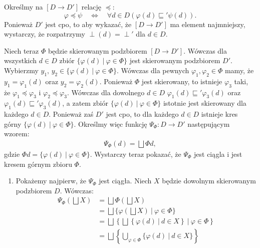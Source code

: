 \begin{dowod}
      Określmy na \([D\to D']\) relację  \(\preceq\):
\[
\varphi \preceq \psi\quad \Leftrightarrow\quad \forall d\in D \left(\varphi(d) \sqsubseteq' \psi(d)\right).
\]
Ponieważ \(D'\) jest cpo, to aby wykazać, że \([D\to D']\) ma element najmniejszy, wystarczy, że rozpatrzymy \(\perp(d)=\perp'\) dla \(d\in D\).

Niech teraz \(\Phi\) będzie skierowanym podzbiorem \([D\to D']\). 
      Wówczas  dla  wszystkich  \(d\in D\)  zbiór  \(\{\varphi(d)\  |\ \varphi\in\Phi\}\) jest  skierowanym podzbiorem  \(D'\). Wybierzmy \(y_1,\,y_2\in\{\varphi(d)\ |\ \varphi\in\Phi\}\). Wówczas dla pewnych \(\varphi_1, \varphi_2\in\Phi\) mamy, że \(y_1=\varphi_1(d)\) oraz \(y_2=\varphi_2(d)\). Ponieważ \(\Phi\) jest skierowany, to istnieje \(\varphi_3\) taki, że \(\varphi_1\preceq \varphi_3\) i \(\varphi_2\preceq \varphi_3\). Wówczas dla dowolnego \(d\in D\) \(\varphi_1(d) \sqsubseteq' \varphi_3(d)\) oraz \(\varphi_1(d) \sqsubseteq' \varphi_3(d)\), a zatem zbiór \(\{\varphi(d)\  |\ \varphi\in\Phi\}\) istotnie jest skierowany dla każdego \(d\in D\). Ponieważ zaś \(D'\) jest cpo, to dla każdego \(d\in D\) istnieje kres górny  \(\{\varphi(d)\  |\ \varphi\in\Phi\}\). Określmy więc funkcję \(\Psi_\Phi: D\to D'\) następującym wzorem:
      \begin{align*}
        \Psi_\Phi(d) = \bigsqcup \Phi d,
      \end{align*}
      gdzie \(\Phi d=\{\varphi(d)\ |\ \varphi \in \Phi\}\). Wystarczy teraz pokazać, że \(\Psi_\Phi\) jest ciągla i jest kresem górnym zbioru \(\Phi\).
      \begin{enumerate}
        \item Pokażemy najpierw, że \(\Psi_\Phi\) jest ciągła. Niech \(X\) będzie dowolnym skierowanym podzbiorem \(D\). Wówczas:
          \begin{align*}
  \Psi_\Phi(\bigsqcup X)&= \bigsqcup \Phi (\bigsqcup X)\\
                        &= \bigsqcup \{\varphi(\bigsqcup X)\ |\ \varphi\in\Phi\}\\
                        &= \bigsqcup \left\{\bigsqcup\left\{\varphi(d)\ |\ d\in X\right\}\ |\ \varphi\in \Phi\right\}\\
                        &= \bigsqcup \left\{\bigcup\limits_{\varphi\in\Phi}\{\varphi(d)\ |\ d\in X\}\right\}\\

\end{align*}
\end{enumerate}
\end{dowod}
